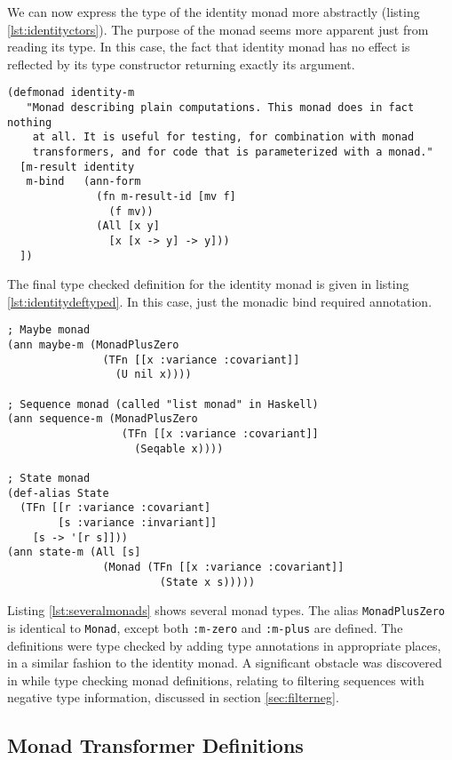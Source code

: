 We can now express the type of the identity monad more abstractly (listing \ref{lst:identityctors}).
The purpose of the monad seems more apparent just from reading its type.
In this case, the fact that identity monad has no effect is reflected
by its type constructor returning exactly its argument.

\begin{lstlisting}[caption=Type checked identity monad definition, label=lst:identitydeftyped]
(defmonad identity-m
   "Monad describing plain computations. This monad does in fact nothing
    at all. It is useful for testing, for combination with monad
    transformers, and for code that is parameterized with a monad."
  [m-result identity
   m-bind   (ann-form
              (fn m-result-id [mv f]
                (f mv))
              (All [x y]
                [x [x -> y] -> y]))
  ])
\end{lstlisting}

The final type checked definition for the identity monad is given in listing \ref{lst:identitydeftyped}.
In this case, just the monadic bind required annotation.

\begin{lstlisting}[caption=Several monad types, label=lst:severalmonads]
; Maybe monad
(ann maybe-m (MonadPlusZero
               (TFn [[x :variance :covariant]] 
                 (U nil x))))

; Sequence monad (called "list monad" in Haskell)
(ann sequence-m (MonadPlusZero 
                  (TFn [[x :variance :covariant]]
                    (Seqable x))))

; State monad
(def-alias State
  (TFn [[r :variance :covariant]
        [s :variance :invariant]]
    [s -> '[r s]]))
(ann state-m (All [s]
               (Monad (TFn [[x :variance :covariant]]
                        (State x s)))))
\end{lstlisting}

Listing \ref{lst:severalmonads} shows several monad types. The alias \lstinline|MonadPlusZero|
is identical to \lstinline|Monad|, except both \lstinline|:m-zero| and \lstinline|:m-plus| are defined.
The definitions were type checked by adding type annotations in appropriate places, in a similar fashion
to the identity monad. A significant obstacle was discovered in while type checking monad definitions,
relating to filtering sequences with negative type information, discussed in section \ref{sec:filterneg}.

\subsection{Monad Transformer Definitions}

